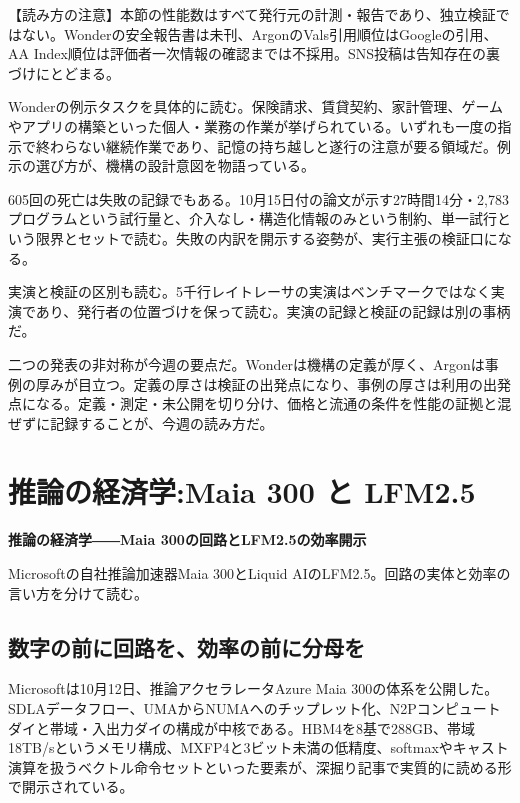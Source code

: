 \documentclass[lualatex,a4paper,10pt]{jlreq}
\begin{document}
\begin{tcolorbox}[colback=SurveySoft,colframe=SurveyRule,arc=1mm,boxrule=0.4pt,left=2mm,right=2mm]
【読み方の注意】本節の性能数はすべて発行元の計測・報告であり、独立検証ではない。Wonderの安全報告書は未刊、ArgonのVals引用順位はGoogleの引用、AA Index順位は評価者一次情報の確認までは不採用。SNS投稿は告知存在の裏づけにとどまる。
\end{tcolorbox}
\cite{B01,B62,B63,B02,B64,B03,B05,B65}


Wonderの例示タスクを具体的に読む。保険請求、賃貸契約、家計管理、ゲームやアプリの構築といった個人・業務の作業が挙げられている。いずれも一度の指示で終わらない継続作業であり、記憶の持ち越しと遂行の注意が要る領域だ。例示の選び方が、機構の設計意図を物語っている。
\cite{B01,B62,B63,B02,B64,B03}


605回の死亡は失敗の記録でもある。10月15日付の論文が示す27時間14分・2,783プログラムという試行量と、介入なし・構造化情報のみという制約、単一試行という限界とセットで読む。失敗の内訳を開示する姿勢が、実行主張の検証口になる。
\cite{B05,B65,B08,B04,B07,B06}


実演と検証の区別も読む。5千行レイトレーサの実演はベンチマークではなく実演であり、発行者の位置づけを保って読む。実演の記録と検証の記録は別の事柄だ。
\cite{B05,B65,B08,B04,B07,B06}


二つの発表の非対称が今週の要点だ。Wonderは機構の定義が厚く、Argonは事例の厚みが目立つ。定義の厚さは検証の出発点になり、事例の厚さは利用の出発点になる。定義・測定・未公開を切り分け、価格と流通の条件を性能の証拠と混ぜずに記録することが、今週の読み方だ。
\cite{B01,B62,B63,B02,B64,B03,B05,B65}


\section{推論の経済学:Maia 300 と LFM2.5}
\label{sec:P2}

{\Large\bfseries 推論の経済学――Maia 300の回路とLFM2.5の効率開示\par}
\smallskip
{\color{SurveyMuted}Microsoftの自社推論加速器Maia 300とLiquid AIのLFM2.5。回路の実体と効率の言い方を分けて読む。\par}
\bigskip

\subsection*{数字の前に回路を、効率の前に分母を}

Microsoftは10月12日、推論アクセラレータAzure Maia 300の体系を公開した。SDLAデータフロー、UMAからNUMAへのチップレット化、N2Pコンピュートダイと帯域・入出力ダイの構成が中核である。HBM4を8基で288GB、帯域18TB/sというメモリ構成、MXFP4と3ビット未満の低精度、softmaxやキャスト演算を扱うベクトル命令セットといった要素が、深掘り記事で実質的に読める形で開示されている。
\cite{B09,B66,B10,B67,B68}
\end{document}

